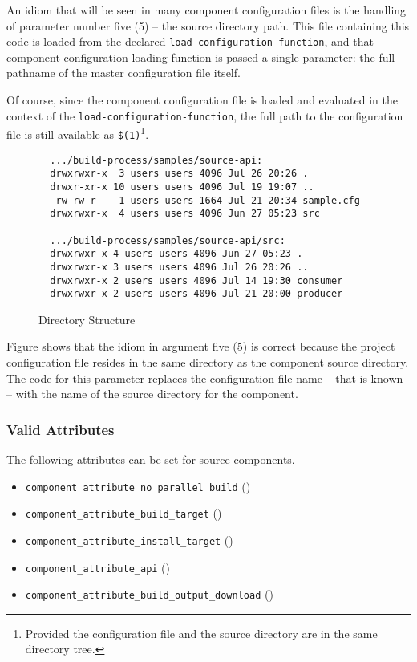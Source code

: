 An idiom that will be seen in many component configuration files is
the handling of parameter number five (5) -- the source directory
path.  This file containing this code is loaded from the declared
\texttt{load-configuration-function}, and that component
configuration-loading function is passed a single parameter: the full
pathname of the master configuration file itself.

Of course, since the component configuration file is loaded and
evaluated in the context of the \texttt{load-configuration-function},
the full path to the configuration file is still available as
\texttt{\$(1)}\footnote{Provided the configuration file and the source
  directory are in the same directory tree.}.

\begin{figure}
\hrulefill
\begin{small}
\begin{verbatim}
  .../build-process/samples/source-api:
  drwxrwxr-x  3 users users 4096 Jul 26 20:26 .
  drwxr-xr-x 10 users users 4096 Jul 19 19:07 ..
  -rw-rw-r--  1 users users 1664 Jul 21 20:34 sample.cfg
  drwxrwxr-x  4 users users 4096 Jun 27 05:23 src

  .../build-process/samples/source-api/src:
  drwxrwxr-x 4 users users 4096 Jun 27 05:23 .
  drwxrwxr-x 3 users users 4096 Jul 26 20:26 ..
  drwxrwxr-x 2 users users 4096 Jul 14 19:30 consumer
  drwxrwxr-x 2 users users 4096 Jul 21 20:00 producer
\end{verbatim}
\end{small}
\hrulefill
\caption{Directory Structure}\label{wrap:config-structure}
\end{figure}

Figure  shows that the idiom in argument
five (5) is correct because the project configuration file resides in
the same directory as the component source directory.  The code for
this parameter replaces the configuration file name -- that is known
-- with the name of the source directory for the component.

\subsubsection{Valid Attributes}

The following attributes can be set for source components.

\begin{itemize}
\item{\texttt{component\_attribute\_no\_parallel\_build}}
  ()
\item{\texttt{component\_attribute\_build\_target}}  ()
\item{\texttt{component\_attribute\_install\_target}} ()
\item{\texttt{component\_attribute\_api}} ()
\item{\texttt{component\_attribute\_build\_output\_download}} ()
\end{itemize}

